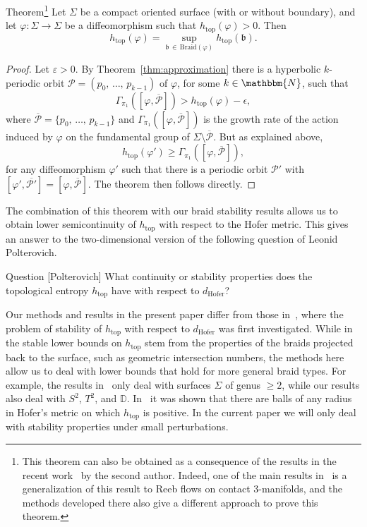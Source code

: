 \documentclass[AHL,Unicode,longabstracts,published]{cedram}
\newcommand{\N}{\mathbbm{N}}
\newcommand{\D}{\mathbb{D}}
\newcommand{\topo}{\mathrm{top}}
\newcommand{\hofer}{\mathrm{Hofer}}
\newcommand{\Braid}{\mathrm{Braid}}
\newcommand{\clP}{\mathcal{P}}
\newcommand{\fkb}{\mathfrak{b}}
\newcommand{\topo}{\mathrm{top}}
\newcommand{\hofer}{\mathrm{Hofer}}
\begin{document}
\begin{enonce*}{Theorem}\footnote{This theorem can also be obtained as a consequence of the results in the recent work~\cite{Meiwes-linking} by the second author. Indeed, one of the main results in~\cite{Meiwes-linking} is a generalization of this result to Reeb flows on contact $3$-manifolds, and the methods developed there also give a different approach to prove this theorem.}
Let $\Sigma$ be a compact oriented surface (with or without boundary), and let $\varphi: \Sigma\to \Sigma$ be a diffeomorphism such that $h_{\topo}(\varphi)>0$. Then
\[
h_{\topo}(\varphi) = \sup_{\fkb\, \in \,\Braid(\varphi)} h_{\topo}(\fkb).
\]
\end{enonce*}
\begin{proof}
Let $\varepsilon>0$. By Theorem~\ref{thm:approximation} there is a hyperbolic $k$-periodic orbit $\clP = (p_0,\, \ldots,\,p_{k-1})$ of $\varphi$, for some $k\in \N$, such that
\[
\Gamma_{\pi_1}\left([\varphi, \overline{\clP}]\right)>h_{\topo}(\varphi)-\epsilon,
\]
where $\overline{\clP} = \{p_0,\,\ldots,\, p_{k-1}\}$ and $\Gamma_{\pi_1}([\varphi, \overline{\clP}])$ is the growth rate of the action induced by $\varphi$ on the fundamental group of $\Sigma \setminus \overline{\clP}$. But as explained above,
\[
h_{\topo}(\varphi')\geq \Gamma_{\pi_1}\left([\varphi, \overline{\clP}]\right),
\]
for any diffeomorphism $\varphi'$ such that there is a periodic orbit $\clP'$ with $[\varphi',\overline{\clP'}]= [\varphi, \overline{\clP}]$. The theorem then follows directly. 
\end{proof}


The combination of this theorem with our braid stability results allows us to obtain lower semicontinuity of $h_{\topo}$ with respect to the Hofer metric. This gives an answer to the two-dimensional version of the following question of Leonid Polterovich.

\begin{enonce}{Question} [Polterovich]
What continuity or stability properties does the topological entropy $h_{\topo}$ have with respect to $d_{\hofer}$?
\end{enonce}





\begin{rema}
Our methods and results in the present paper differ from those in~\cite{chor-meiwes}, where the problem of stability of $h_{\topo}$ with respect to $d_{\hofer}$ was first investigated. While in~\cite{chor-meiwes} the stable lower bounds on $h_{\topo}$ stem from the properties of the braids projected back to the surface, such as geometric intersection numbers, the methods here allow us to deal with lower bounds that hold for more general braid types. For example, the results in~\cite{chor-meiwes} only deal with surfaces $\Sigma$ of genus $\geq 2$, while our results also deal with $S^2$, $T^2$, and $\D$. In~\cite{chor-meiwes} it was shown that there are balls of any radius in Hofer's metric on which $h_{\topo}$ is positive. In the current paper we will only deal with stability properties under small perturbations.
\end{rema}
\end{document}
